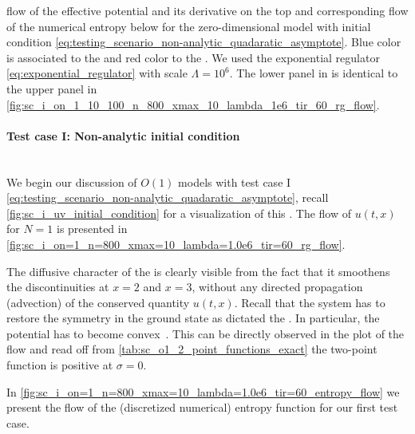 	{%
		\caption{
			\frg{} flow of the effective potential and its derivative on the top  and corresponding flow of the numerical entropy below   for the zero-dimensional  model with initial condition \cref{eq:testing_scenario_non-analytic_quadaratic_asymptote}.
			{Blue} color is associated to the \uv{} and {red} color to the \ir{}.
			We used the exponential regulator \cref{eq:exponential_regulator} with \uv{} scale $\Lambda = 10^6$.
			The lower panel in  is identical to the upper panel in \cref{fig:sc_i_on_1_10_100_n_800_xmax_10_lambda_1e6_tir_60_rg_flow}.
		}\label{fig:sc_i_on=1_n=800_xmax=10_lambda=1.0e6_tir=60}
		\vspace{2cm}
	}%
\FloatBarrier
\paragraph{Test case I: Non-analytic initial condition}\label{paragraph:sc1O1}\mbox{}\\%
We begin our discussion of $O(1)$ models with test case I \eqref{eq:testing_scenario_non-analytic_quadaratic_asymptote}, recall \cref{fig:sc_i_uv_initial_condition} for a visualization of this \ic{}.
The \frg{} flow of $u ( t, x )$ for $N=1$ is presented in \cref{fig:sc_i_on=1_n=800_xmax=10_lambda=1.0e6_tir=60_rg_flow}.

The diffusive character of the \sigmaMode{} is clearly visible from the fact that it smoothens the discontinuities at $x = 2$ and $x = 3$, without any directed propagation (advection) of the conserved quantity $u ( t, x )$. 
Recall that the system has to restore the \ZII{} symmetry in the ground state as dictated the \cmwhTheoremWithRefs{}.
In particular, the potential has to become convex~\cite{Wipf:2013vp,Fujimoto:1982tc}.
This can be directly observed in the plot of the \frg{} flow and read off from \cref{tab:sc_o1_2_point_functions_exact} \dash{} the two-point function is positive at $\sigma = 0$.\bigskip
	
In \cref{fig:sc_i_on=1_n=800_xmax=10_lambda=1.0e6_tir=60_entropy_flow} we present the \frg{} flow of the (discretized numerical) entropy function for our first test case.

